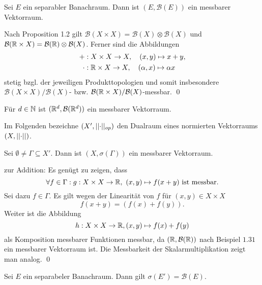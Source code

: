 \begin{proposition}
    Sei $E$ ein separabler Banachraum. Dann ist $(E, \mathcal{B}(E))$ ein messbarer Vektorraum.
\end{proposition}
\begin{proof*}
    Nach Proposition 1.2 gilt $\mathcal{B}(X \times X) = \mathcal{B}(X) \otimes \mathcal{B}(X)$ und 
    $\mathcal{B}(\mathbb{R} \times X) = \mathcal{B}(\mathbb{R}) \otimes \mathcal{B}(X)$. Ferner sind die Abbildungen 
    \begin{align*}
        + &: X \times X \to X, \quad (x,y) \mapsto x + y, \\\
        \cdot &: \mathbb{R} \times X \to X, \quad (\alpha, x) \mapsto \alpha  x
    \end{align*}
    stetig bzgl. der jeweiligen Produkttopologien und somit insbesondere $\mathcal{B}(X \times X)/\mathcal{B}(X)$- bzw. 
    $\mathcal{B}(\mathbb{R} \times X)/\mathcal{B}(X)$-messbar. \qed
\end{proof*}

\begin{example}
    Für $d \in \mathbb{N}$ ist $(\mathbb{R}^d, \mathcal{B}(\mathbb{R}^d))$ ein messbarer Vektorraum. 
\end{example}

Im Folgenden bezeichne $(X', \lvert\lvert \cdot \rvert\rvert_{op})$ den Dualraum eines normierten Vektorraums $(X, \lvert\lvert \cdot \rvert\rvert)$. 

\begin{proposition}
    Sei $\emptyset \neq \Gamma \subseteq X'$. Dann ist $(X, \sigma({\Gamma}))$ ein messbarer Vektorraum. 
\end{proposition}

\begin{proof*}%
    zur Addition: Es genügt zu zeigen, dass 
    $$
        \forall f \in \Gamma : g: X \times X \to \R, \ (x,y) \mapsto f(x+y) \text{ ist messbar.}
    $$
    Sei dazu $f \in \Gamma$. Es gilt wegen der Linearität von $f$ für $(x,y) \in X \times X$
    $$
        f(x + y) = (f(x) + f(y)).
    $$
    Weiter ist die Abbildung 
    $$
        h: X \times X \to \mathbb{R}, (x,y) \mapsto f(x) + f(y)
    $$
    als Komposition messbarer Funktionen messbar, da $(\mathbb{R}, \mathcal{B}(\mathbb{R}))$ nach Beispiel $1.31$ ein messbarer Vektorraum ist. 
    Die Messbarkeit der Skalarmultiplikation zeigt man analog. \qed 
\end{proof*}

\begin{proposition}
    Sei $E$ ein separabeler Banachraum. Dann gilt $\sigma(E') = \mathcal{B}(E)$. 
\end{proposition}

